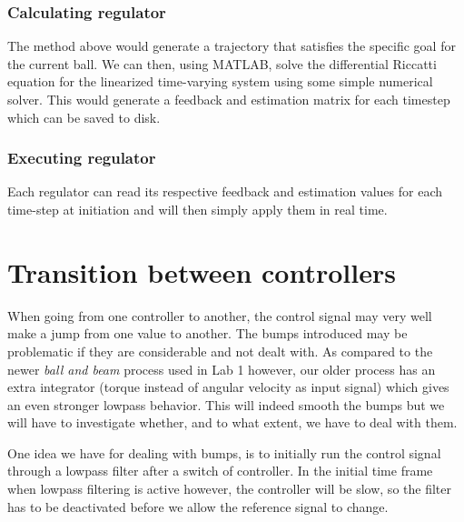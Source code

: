\documentclass{article}
\begin{document}
\subsubsection{Calculating regulator}
The method above would generate a trajectory that satisfies the specific goal for the current ball. We can then, using MATLAB, solve the differential Riccatti equation for the linearized time-varying system using some simple numerical solver. This would generate a feedback and estimation matrix for each timestep which can be saved to disk.
\subsubsection{Executing regulator}
Each regulator can read its respective feedback and estimation values for each time-step at initiation and will then simply apply them in real time.


\section{Transition between controllers}
When going from one controller to another, the control signal may very well make a jump from one value to another. The bumps introduced may be problematic if they are considerable and not dealt with. As compared to the newer \emph{ball and beam} process used in Lab 1 however, our older process has an extra integrator (torque instead of angular velocity as input signal) which gives an even stronger lowpass behavior. This will indeed smooth the bumps but we will have to investigate whether, and to what extent, we have to deal with them.

One idea we have for dealing with bumps, is to initially run the control signal through a lowpass filter after a switch of controller. In the initial time frame when lowpass filtering is active however, the controller will be slow, so the filter has to be deactivated before we allow the reference signal to change.
\end{document}
